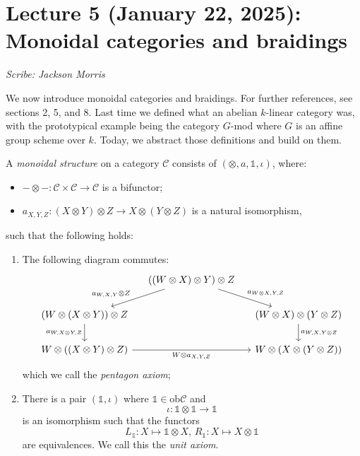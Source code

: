 \section{Lecture 5 (January 22, 2025): Monoidal categories and braidings}\label{lec5}
\noindent\textit{Scribe: Jackson Morris}
 
We now introduce monoidal categories and braidings. For further references, see \cite{EGNO} sections 2, 5, and 8. Last time we defined what an abelian $k$-linear category was, with the prototypical example being the category $G$-mod where $G$ is an affine group scheme over $k$. Today, we abstract those definitions and build on them.

\begin{definition}
    A \textit{monoidal structure} on a category $\mathcal{C}$ consists of $(\otimes,a,\mathbb{1},\iota)$, where:
    \begin{itemize}
        \item $- \otimes -:\mathcal{C} \times \mathcal{C} \to \mathcal{C}$ is a bifunctor;
        \item $a_{X,Y,Z}:(X\otimes Y)\otimes Z\to X\otimes(Y\otimes Z)$ is a natural isomorphism,
    \end{itemize}
    such that the following holds:
    \begin{enumerate}
    \item The following diagram commutes:\[\begin{tikzcd}[column sep=small]
	& {((W \otimes X) \otimes Y) \otimes Z} \\
	{(W \otimes (X \otimes Y)) \otimes Z} && {(W \otimes X) \otimes (Y \otimes Z)} \\
	{W \otimes ((X \otimes Y) \otimes Z)} && {W \otimes (X \otimes (Y \otimes Z))}
	\arrow["{a_{W,X,Y} \otimes Z}"'{pos=0.6}, from=1-2, to=2-1]
	\arrow["{a_{W \otimes X, Y, Z}}", from=1-2, to=2-3]
	\arrow["{a_{W, X \otimes Y, Z}}"', from=2-1, to=3-1]
	\arrow["{a_{W,X,Y \otimes Z}}", from=2-3, to=3-3]
	\arrow["{W \otimes a_{X, Y, Z}}"', from=3-1, to=3-3]
    \end{tikzcd}\]
    which we call the \textit{pentagon axiom};
    \item There is a pair $(\mathbb{1}, \iota)$ where $\mathbb{1} \in \text{ob}\mathcal{C}$ and
    \[ \iota: \mathbb{1} \otimes \mathbb{1} \to \mathbb{1}\]
    is an isomorphism such that the functors
    \[L_\mathbb{1}:X \mapsto \mathbb{1} \otimes X, \, R_\mathbb{1}:X \mapsto X \otimes \mathbb{1}\]
    are equivalences. We call this the \textit{unit axiom}.
    \end{enumerate}
\end{definition}


